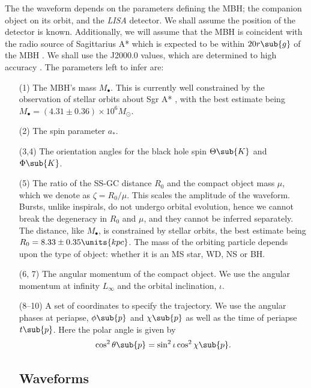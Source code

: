 \documentclass[11pt,twoside]{article}
\begin{document}
The the waveform depends on the parameters defining the MBH; the companion object on its orbit, and the \textit{LISA} detector. We shall assume the position of the detector is known. Additionally, we will assume that the MBH is coincident with the radio source of Sagittarius A*
which is expected to be within $20 r\sub{g}$ of the MBH \citep{Reid2003,Doeleman2008}. We shall use the J2000.0 values, which are determined to high accuracy \citep{Reid1999, Yusef-Zadeh1999}. The parameters left to infer are:
\begin{enumerate}
\item[(1)] The MBH's mass $M_\bullet$. This is currently well constrained by the observation of stellar orbits about Sgr A* \citep{Ghez2008, Gillessen2009}, with the best estimate being $M_\bullet = (4.31 \pm 0.36) \times 10^6 M_\odot$.
\item[(2)] The spin parameter $a_\ast$.
\item[(3,4)] The orientation angles for the black hole spin $\Theta\sub{K}$ and $\Phi\sub{K}$.
\item[(5)] The ratio of the SS-GC distance $R_0$ and the compact object mass $\mu$, which we denote as $\zeta = R_0/\mu$. This scales the amplitude of the waveform. Bursts, unlike inspirals, do not undergo orbital evolution, hence we cannot break the degeneracy in $R_0$ and $\mu$, and they cannot be inferred separately. The distance, like $M_\bullet$, is constrained by stellar orbits, the best estimate being \citep{Gillessen2009} $R_0 = 8.33 \pm 0.35\units{kpc}$. The mass of the orbiting particle depends upon the type of object: whether it is an MS star, WD, NS or BH.
\item[(6, 7)] The angular momentum of the compact object. We use the angular momentum at infinity $L_\infty$ and the orbital inclination, $\iota$.
\item[(8--10)] A set of coordinates to specify the trajectory. We use the angular phases at periapse, $\phi\sub{p}$ and $\chi\sub{p}$ as well as the time of periapse $t\sub{p}$. Here the polar angle is given by
\begin{equation}
\cos^2\theta\sub{p} = \sin^2\iota\cos^2\chi\sub{p}.
\end{equation}

\subsection{Waveforms}


\end{enumerate}
\end{document}
